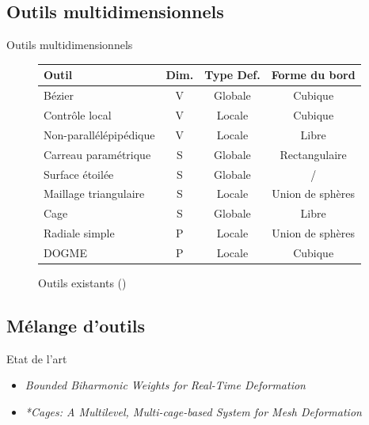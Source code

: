 \documentclass[xcolor=x11names,compress]{beamer}
\renewcommand{\(}{\begin{columns}} \renewcommand{\)}{\end{columns}}
\newcommand{\<}[1]{\begin{column}{#1}} \renewcommand{\>}{\end{column}}
\begin{document}
\subsection{Outils multidimensionnels}
\begin{frame}{Outils multidimensionnels}


  \begin{figure}[h]
    \begin{center}
      \begin{tabular}{|l|c|c|c|}
        \hline
        \textbf{Outil} & \textbf{Dim.} & \textbf{Type Def.} & \textbf{Forme du bord} \\
        \hline
        \hline
        Bézier & V & Globale & Cubique\\
        \hline
        Contrôle local & V & Locale & Cubique\\
        \hline
        Non-parallélépipédique & V & Locale & Libre\\
        \hline
        \hline
        Carreau paramétrique & S & Globale & Rectangulaire\\
        \hline
        Surface étoilée & S & Globale & /\\
        \hline
        Maillage triangulaire & S & Locale & Union de sphères\\
        \hline
        Cage & S & Globale & Libre\\
        \hline
        \hline
        Radiale simple & P & Locale & Union de sphères\\
        \hline
        DOGME & P & Locale & Cubique\\
        \hline
      \end{tabular}
      \caption{Outils existants (\cite{GB08})}
    \end{center}
  \end{figure}
\end{frame}

\subsection{Mélange d'outils}

\begin{frame}{Etat de l'art}
  \begin{itemize}
  \item \textit{Bounded Biharmonic Weights for Real-Time Deformation}
    \cite{JBPS11}
  \item \textit{*Cages: A Multilevel, Multi-cage-based System for Mesh
      Deformation} \cite{GPCP13}
  \end{itemize}
\end{frame}
\end{document}

